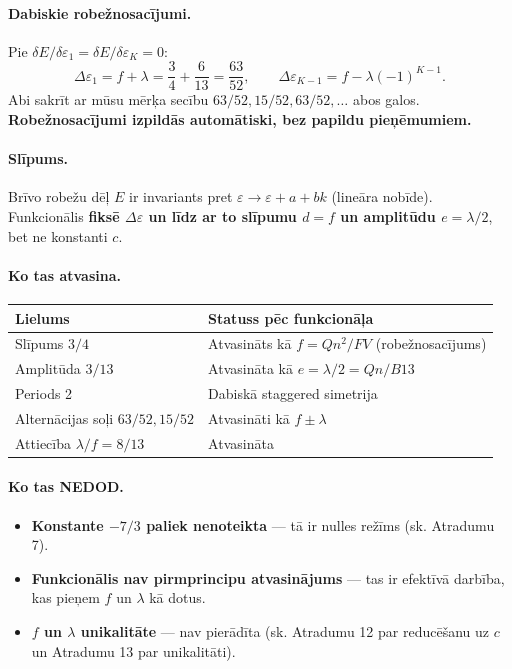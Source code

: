 \documentclass[12pt,a4paper]{article}
\begin{document}
\paragraph{Dabiskie robežnosacījumi.}
Pie $\delta E / \delta \varepsilon_1 = \delta E / \delta \varepsilon_K = 0$:
\[
\Delta\varepsilon_1 = f + \lambda = \frac{3}{4} + \frac{6}{13} = \frac{63}{52}, \qquad
\Delta\varepsilon_{K-1} = f - \lambda(-1)^{K-1}.
\]
Abi sakrīt ar mūsu mērķa secību $63/52, 15/52, 63/52, \ldots$ abos galos. \textbf{Robežnosacījumi izpildās automātiski, bez papildu pieņēmumiem.}

\paragraph{Slīpums.}
Brīvo robežu dēļ $E$ ir invariants pret $\varepsilon \to \varepsilon + a + bk$ (lineāra nobīde). Funkcionālis \textbf{fiksē $\Delta\varepsilon$ un līdz ar to slīpumu $d = f$ un amplitūdu $e = \lambda/2$}, bet ne konstanti $c$.

\paragraph{Ko tas atvasina.}
\begin{table}[h]
\centering
\begin{tabular}{|l|l|}
\hline
\textbf{Lielums} & \textbf{Statuss pēc funkcionāļa} \\
\hline
Slīpums $3/4$ & Atvasināts kā $f = Qn^2/FV$ (robežnosacījums) \\
Amplitūda $3/13$ & Atvasināta kā $e = \lambda/2 = Qn/B13$ \\
Periods 2 & Dabiskā staggered simetrija \\
Alternācijas soļi $63/52, 15/52$ & Atvasināti kā $f \pm \lambda$ \\
Attiecība $\lambda/f = 8/13$ & Atvasināta \\
\hline
\end{tabular}
\end{table}

\paragraph{Ko tas NEDOD.}
\begin{itemize}
    \item \textbf{Konstante $-7/3$ paliek nenoteikta} — tā ir nulles režīms (sk. Atradumu 7).
    \item \textbf{Funkcionālis nav pirmprincipu atvasinājums} — tas ir efektīvā darbība, kas pieņem $f$ un $\lambda$ kā dotus.
    \item \textbf{$f$ un $\lambda$ unikalitāte} — nav pierādīta (sk. Atradumu 12 par reducēšanu uz $c$ un Atradumu 13 par unikalitāti).
\end{itemize}
\end{document}
